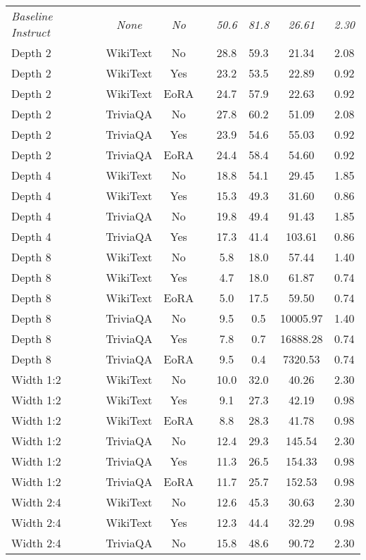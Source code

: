 \begin{longtable}{lcclcccc}
\hline
\endlastfoot
\textit{Baseline Instruct} & \textit{None} & \textit{No} & & \textit{50.6} & \textit{81.8} & \textit{26.61} & \textit{2.30} \\
Depth 2 & WikiText & No & & 28.8 & 59.3 & 21.34 & 2.08 \\
Depth 2 & WikiText & Yes & & 23.2 & 53.5 & 22.89 & 0.92 \\
Depth 2 & WikiText & EoRA & & 24.7 & 57.9 & 22.63 & 0.92 \\
Depth 2 & TriviaQA & No & & 27.8 & 60.2 & 51.09 & 2.08 \\
Depth 2 & TriviaQA & Yes & & 23.9 & 54.6 & 55.03 & 0.92 \\
Depth 2 & TriviaQA & EoRA & & 24.4 & 58.4 & 54.60 & 0.92 \\
Depth 4 & WikiText & No & & 18.8 & 54.1 & 29.45 & 1.85 \\
Depth 4 & WikiText & Yes & & 15.3 & 49.3 & 31.60 & 0.86 \\
Depth 4 & TriviaQA & No & & 19.8 & 49.4 & 91.43 & 1.85 \\
Depth 4 & TriviaQA & Yes & & 17.3 & 41.4 & 103.61 & 0.86 \\
Depth 8 & WikiText & No & & 5.8 & 18.0 & 57.44 & 1.40 \\
Depth 8 & WikiText & Yes & & 4.7 & 18.0 & 61.87 & 0.74 \\
Depth 8 & WikiText & EoRA & & 5.0 & 17.5 & 59.50 & 0.74 \\
Depth 8 & TriviaQA & No & & 9.5 & 0.5 & 10005.97 & 1.40 \\
Depth 8 & TriviaQA & Yes & & 7.8 & 0.7 & 16888.28 & 0.74 \\
Depth 8 & TriviaQA & EoRA & & 9.5 & 0.4 & 7320.53 & 0.74 \\
Width 1:2 & WikiText & No & & 10.0 & 32.0 & 40.26 & 2.30 \\
Width 1:2 & WikiText & Yes & & 9.1 & 27.3 & 42.19 & 0.98 \\
Width 1:2 & WikiText & EoRA & & 8.8 & 28.3 & 41.78 & 0.98 \\
Width 1:2 & TriviaQA & No & & 12.4 & 29.3 & 145.54 & 2.30 \\
Width 1:2 & TriviaQA & Yes & & 11.3 & 26.5 & 154.33 & 0.98 \\
Width 1:2 & TriviaQA & EoRA & & 11.7 & 25.7 & 152.53 & 0.98 \\
Width 2:4 & WikiText & No & & 12.6 & 45.3 & 30.63 & 2.30 \\
Width 2:4 & WikiText & Yes & & 12.3 & 44.4 & 32.29 & 0.98 \\
Width 2:4 & TriviaQA & No & & 15.8 & 48.6 & 90.72 & 2.30 \\

\end{longtable}
